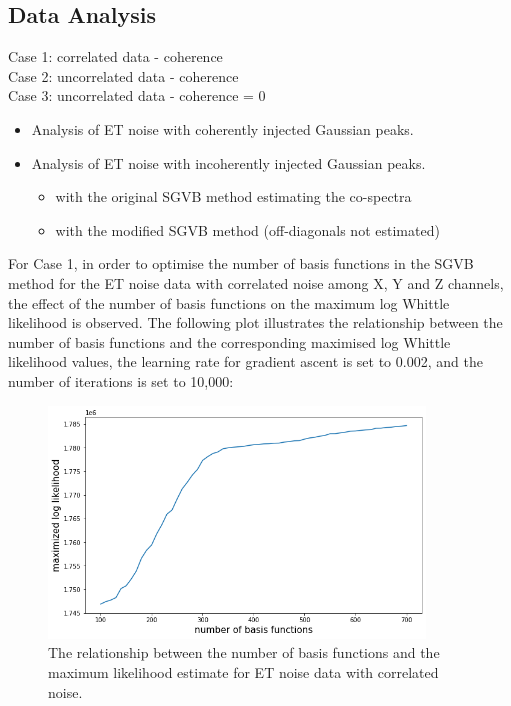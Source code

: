 \documentclass[%
 reprint,
 amsmath,amssymb,
 aps,
]{revtex4-2}
\begin{document}
\subsection{Data Analysis}
\noindent
Case 1: correlated data - coherence \\
Case 2: uncorrelated data - coherence \\
Case 3: uncorrelated data - coherence = 0

\begin{itemize}
  \item Analysis of ET noise with coherently injected Gaussian peaks.
  \item Analysis of ET noise with incoherently injected Gaussian peaks.
  \begin{itemize}
      \item with the original SGVB method estimating the co-spectra
      \item with the modified SGVB method (off-diagonals not estimated) 
  \end{itemize}
\end{itemize}

For Case 1, in order to optimise the number of basis functions in the SGVB method for the ET noise data with correlated noise among X, Y and Z channels, the effect of the number of basis functions on the maximum log Whittle likelihood is observed. The following plot illustrates the relationship between the number of basis functions and the corresponding maximised log Whittle likelihood values, the learning rate for gradient ascent is set to 0.002, and the number of iterations is set to 10,000:
\begin{figure}
\centering
  \includegraphics[width=10cm]{num basis funs vs mls ET corr.png}
  \caption{The relationship between the number of basis functions and the maximum likelihood estimate for ET noise data with correlated noise.}
  \label{et_corr_basis_funs_vs_mle}
\end{figure}
\end{document}
